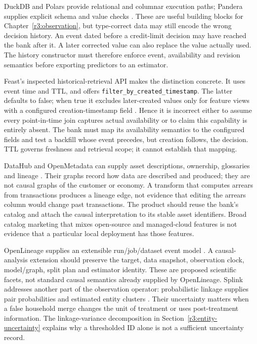 DuckDB and Polars provide relational and columnar execution paths;
Pandera supplies explicit schema and value checks
\citep{sw_duckdb,sw_polars,sw_pandera}. These are useful building blocks
for Chapter~\ref{r3:observation}, but type-correct data may still encode
the wrong decision history. An event dated before a credit-limit decision
may have reached the bank after it. A later corrected value can also
replace the value actually used. The history constructor must therefore
enforce event, availability and revision semantics before exporting
predictors to an estimator.

Feast's inspected historical-retrieval API makes the distinction concrete.
It uses event time and TTL, and offers
\texttt{filter\_by\_created\_timestamp}. The latter defaults to false;
when true it excludes later-created values only for feature views with
a configured creation-timestamp field \citep{sw_feast}. Hence it is
incorrect either to assume every point-in-time join captures actual
availability or to claim this capability is entirely absent. The bank
must map its availability semantics to the configured fields and test a
backfill whose event precedes, but creation follows, the decision.
TTL governs freshness and retrieval scope; it cannot establish that mapping.

DataHub and OpenMetadata can supply asset descriptions, ownership,
glossaries and lineage \citep{sw_datahub,sw_openmetadata}. Their graphs
record how data are described and produced; they are not causal graphs
of the customer or economy. A transform that computes arrears from
transactions produces a lineage edge, not evidence that editing the
arrears column would change past transactions. The product should reuse
the bank's catalog and attach the causal interpretation to its stable
asset identifiers. Broad catalog marketing that mixes open-source and
managed-cloud features is not evidence that a particular local deployment
has those features.

OpenLineage supplies an extensible run/job/dataset event model
\citep{sw_openlineage}. A causal-analysis extension should preserve the
target, data snapshot, observation clock, model/graph, split plan and
estimator identity. These are proposed scientific facets, not standard
causal semantics already supplied by OpenLineage. Splink addresses another
part of the observation operator: probabilistic linkage supplies pair
probabilities and estimated entity clusters \citep{sw_splink}. Their
uncertainty matters when a false household merge changes the unit of
treatment or uses post-treatment information. The linkage-variance
decomposition in Section~\ref{r3:entity-uncertainty} explains why a
thresholded ID alone is not a sufficient uncertainty record.

